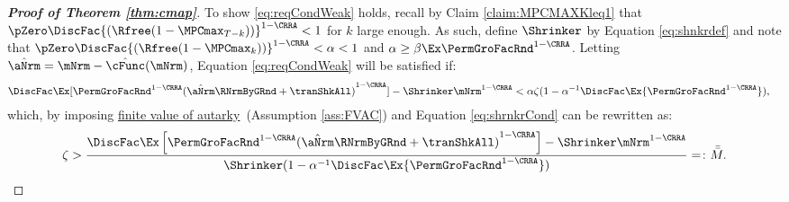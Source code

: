 \documentclass[\econtexRoot/BufferStockTheory]{subfiles}
\begin{document}
\begin{proof}[\textbf{Proof of Theorem \ref{thm:cmap}}]
To show \eqref{eq:reqCondWeak} holds, recall by Claim \ref{claim:MPCMAXKleq1} that $\pZero \DiscFac {(\Rfree (1-\MPCmax_{T-k}))}^{1-\CRRA}   < 1$ for $k$ large enough.
As such, define $\Shrinker$ by Equation \eqref{eq:shnkrdef} and note that $\pZero \DiscFac {(\Rfree (1-\MPCmax_{k}))}^{1-\CRRA} < \alpha < 1$ and $\alpha\geq \beta\Ex\PermGroFacRnd^{1-\CRRA}$.
Letting $\hat{\aNrm} = \mNrm - \hat{\cFunc}(\mNrm)$, Equation \eqref{eq:reqCondWeak} will be satisfied if:
%
\begin{align*}
  \DiscFac \Ex [{\PermGroFacRnd^{1-\CRRA }}{(\hat{\aNrm}\RNrmByGRnd+\tranShkAll)}^{1-\CRRA}]-\Shrinker\mNrm^{1-\CRRA}  & < \alpha\zeta(1-\alpha^{-1}\DiscFac\Ex {\PermGroFacRnd^{1-\CRRA }}),
\end{align*}
%
which, by imposing \hyperlink{FVAC}{finite value of autarky}~(Assumption \ref{ass:FVAC}) and Equation \eqref{eq:shrnkrCond} can be rewritten as:
%
\begin{equation}\begin{gathered}\begin{aligned}
      \zeta >\frac{\DiscFac \Ex\left[\PermGroFacRnd^{1-\CRRA}{(\hat{\aNrm}\RNrmByGRnd +\tranShkAll)}^{1-\CRRA}\right]- \Shrinker\mNrm^{1-\CRRA}}{\Shrinker(1-\alpha^{-1}\DiscFac\Ex {\PermGroFacRnd^{1-\CRRA }})}= \colon\bar{\bar{M}} \label{eq:KeyCondition}.
    \end{aligned}\end{gathered}\end{equation}


\end{proof}
\end{document}
